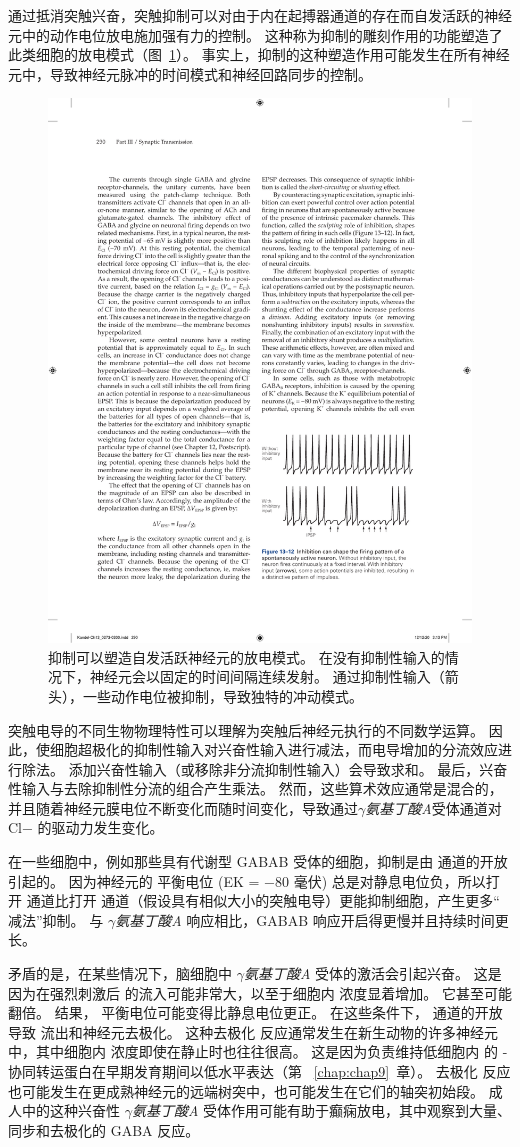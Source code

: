 通过抵消突触兴奋，突触抑制可以对由于内在起搏器通道的存在而自发活跃的神经元中的动作电位放电施加强有力的控制。
这种称为抑制的雕刻作用的功能塑造了此类细胞的放电模式（图~\ref{fig:13_12}）。 
事实上，抑制的这种塑造作用可能发生在所有神经元中，导致神经元脉冲的时间模式和神经回路同步的控制。


\begin{figure}[htbp]
	\centering
	\includegraphics[width=0.5\linewidth]{chap13/fig_13_12}
	\caption{抑制可以塑造自发活跃神经元的放电模式。 在没有抑制性输入的情况下，神经元会以固定的时间间隔连续发射。 通过抑制性输入（箭头），一些动作电位被抑制，导致独特的冲动模式。}
	\label{fig:13_12}
\end{figure}


突触电导的不同生物物理特性可以理解为突触后神经元执行的不同数学运算。
因此，使细胞超极化的抑制性输入对兴奋性输入进行减法，而电导增加的分流效应进行除法。
添加兴奋性输入（或移除非分流抑制性输入）会导致求和。
最后，兴奋性输入与去除抑制性分流的组合产生乘法。
然而，这些算术效应通常是混合的，并且随着神经元膜电位不断变化而随时间变化，导致通过\textit{$\gamma$氨基丁酸A}受体通道对 Cl− 的驱动力发生变化。


在一些细胞中，例如那些具有代谢型 GABAB 受体的细胞，抑制是由  通道的开放引起的。
因为神经元的  平衡电位 (EK = −80 毫伏) 总是对静息电位负，所以打开  通道比打开  通道（假设具有相似大小的突触电导）更能抑制细胞，产生更多“ 减法”抑制。
与 \textit{$\gamma$氨基丁酸A} 响应相比，GABAB 响应开启得更慢并且持续时间更长。


矛盾的是，在某些情况下，脑细胞中 \textit{$\gamma$氨基丁酸A} 受体的激活会引起兴奋。
这是因为在强烈刺激后  的流入可能非常大，以至于细胞内  浓度显着增加。
它甚至可能翻倍。
结果， 平衡电位可能变得比静息电位更正。
在这些条件下， 通道的开放导致  流出和神经元去极化。
这种去极化  反应通常发生在新生动物的许多神经元中，其中细胞内  浓度即使在静止时也往往很高。
这是因为负责维持低细胞内  的 - 协同转运蛋白在早期发育期间以低水平表达（第 ~\ref{chap:chap9}~章）。
去极化  反应也可能发生在更成熟神经元的远端树突中，也可能发生在它们的轴突初始段。
成人中的这种兴奋性 \textit{$\gamma$氨基丁酸A} 受体作用可能有助于癫痫放电，其中观察到大量、同步和去极化的 GABA 反应。




